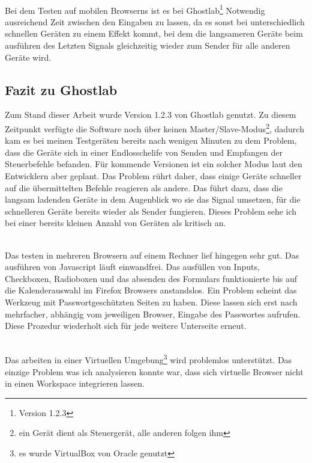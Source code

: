 		\\Bei dem Testen auf mobilen Browserns ist es bei Ghostlab\footnote{Version 1.2.3} Notwendig ausreichend Zeit zwischen 		den Eingaben zu lassen, da es sonst bei unterschiedlich schnellen Geräten zu einem Effekt kommt, bei dem die 				langsameren Geräte beim ausführen des Letzten Signals gleichzeitig wieder zum Sender für alle anderen Geräte wird.
		
		\pagebreak
		
		\subsection{Fazit zu Ghostlab}
		Zum Stand dieser Arbeit wurde Version 1.2.3 von Ghostlab genutzt. Zu diesem Zeitpunkt verfügte die Software noch über 		keinen Master/Slave-Modus\footnote{ein Gerät dient als Steuergerät, alle anderen folgen ihm}, dadurch kam es bei meinen 		Testgeräten bereits nach wenigen Minuten zu dem Problem, dass die Geräte sich in einer 								Endlosschelife von Senden und Empfangen der Steuerbefehle befanden. Für kommende Versionen ist ein solcher Modus 		laut den Entwicklern aber geplant. Das Problem rührt daher, dass einige Geräte schneller auf die übermittelten Befehle 			reagieren als andere. Das führt dazu, dass die langsam ladenden Geräte in dem Augenblick wo sie das Signal umsetzen, 		für die schnelleren Geräte bereits wieder als Sender fungieren. Dieses Problem sehe ich bei einer bereits kleinen Anzahl 			von Geräten als kritisch an. 

		\\Das testen in mehreren Browsern auf einem Rechner lief hingegen sehr gut. Das ausführen von Javascript läuft 				einwandfrei. Das ausfüllen von Inputs, Checkboxen, Radioboxen und das absenden des Formulars funktionierte bis auf die 		Kalenderauswahl im Firefox Browsers anstandslos. Ein Problem scheint das Werkzeug mit Passwortgeschützten Seiten zu 		haben. Diese lassen sich erst nach mehrfacher, abhängig vom jeweiligen Browser, Eingabe des Passwortes aufrufen. 			Diese Prozedur wiederholt sich für jede weitere Unterseite erneut. 

		\\Das arbeiten in einer Virtuellen Umgebung\footnote{es wurde VirtualBox von Oracle genutzt} wird problemlos unterstützt. 		Das einzige Problem was ich analysieren konnte war, dass sich virtuelle Browser nicht in einen Workspace integrieren 			lassen.

